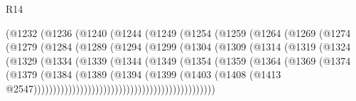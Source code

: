 \begin{lexlean}{R14}
\begin{coremodule}
                      (@1232
                        (@1236
                          (@1240
                            (@1244
                              (@1249
                                (@1254
                                  (@1259
                                    (@1264
                                      (@1269
                                        (@1274
                                          (@1279
                                            (@1284
                                              (@1289
                                                (@1294
                                                  (@1299
                                                    (@1304
                                                      (@1309
                                                        (@1314
                                                          (@1319
                                                            (@1324
                                                              (@1329
                                                                (@1334
                                                                  (@1339
                                                                    (@1344
                                                                      (@1349
                                                                        (@1354
                                                                          (@1359
                                                                            (@1364
                                                                              (@1369
                                                                                (@1374
                                                                                  (@1379
                                                                                    (@1384
                                                                                      (@1389
                                                                                        (@1394
                                                                                          (@1399
                                                                                            (@1403
                                                                                              (@1408
                                                                                                (@1413
                                                                                                  @2547)))))))))))))))))))))))))))))))))))))))))))))))

\end{coremodule}
\end{lexlean}
